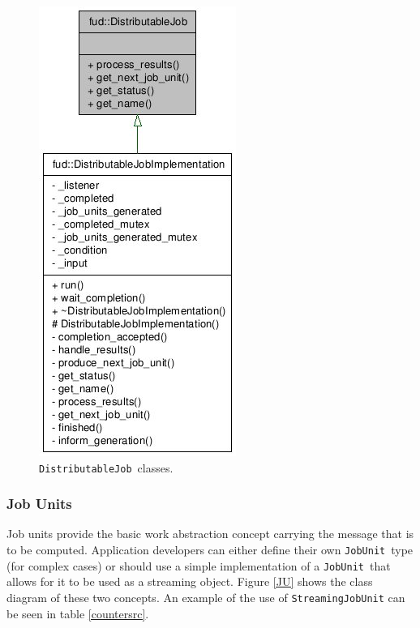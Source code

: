 \documentclass[a4paper,12pt,english]{report}
\renewcommand{\DJ}{\texttt{DistributableJob}}
\newcommand{\JU}{\texttt{JobUnit}}
\begin{document}
\begin{figure}[!ht]
\begin{center}
\includegraphics [bb= 0 0 121 277]{images/DJs.jpg}
\end{center}
\caption{\DJ \ classes.}
\label{DJs}
\end{figure}

\subsubsection{Job Units}

Job units provide the basic work abstraction concept carrying the message that is to be computed. Application developers can either define their own \JU \ type (for complex cases) or should use a simple implementation of a \JU \ that allows for it to be used as a streaming object. Figure \ref{JU} shows the class diagram of these two concepts. An example of the use of \texttt{StreamingJobUnit} can be seen in table \ref{countersrc}.
\end{document}
